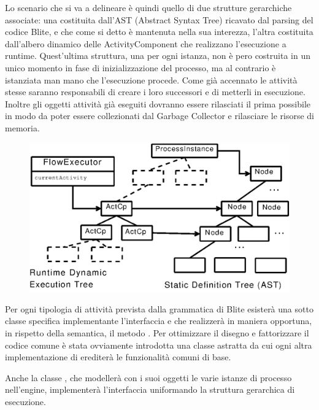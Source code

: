 Lo scenario che si va a delineare \`e quindi quello di due strutture gerarchiche
associate: una costituita dall'AST (Abstract Syntax Tree) ricavato dal
parsing del codice Blite, e che come si detto \`e mantenuta nella sua interezza,
l'altra costituita dall'albero dinamico delle ActivityComponent che
realizzano l'esecuzione a runtime. Quest'ultima struttura, una per ogni
istanza, non \`e pero costruita in un unico momento in fase di inizializzazione
del  processo, ma al contrario \`e istanziata man mano che l'esecuzione
procede.  Come già accennato le attività stesse saranno responsabili di creare
i loro successori e di metterli in esecuzione. Inoltre gli oggetti attività
già eseguiti dovranno essere rilasciati il prima possibile in modo da poter 
essere collezionati dal Garbage Collector e rilasciare le risorse di memoria.

\begin{figure}[!htp]
\begin{center}
  \includegraphics{architettura_interna/dia/tries}
  \label{fig:1}
\end{center}
\end{figure}

Per ogni tipologia di attività prevista dalla grammatica di Blite esisterà
una sotto classe specifica implementante l'interfaccia 
e che realizzerà in maniera opportuna, in rispetto della semantica, il metodo
. Per ottimizzare il disegno e fattorizzare
il codice comune \`e stata ovviamente introdotta una classe astratta
 da cui ogni altra implementazione di
 erediterà le funzionalità comuni di base.

Anche la classe , che modellerà con i suoi oggetti le
varie istanze di processo nell'engine, implementerà l'interfaccia
 uniformando la struttura gerarchica di esecuzione.

